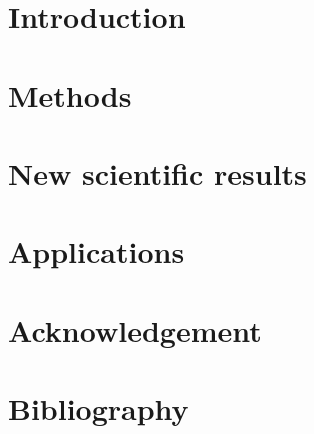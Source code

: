 \documentclass[twoside]{article}
\begin{document}


\section{Introduction}
% 
% 
\section{Methods}


\section{New scientific results}


\section{Applications}


\section{Acknowledgement}
%

\pagebreak
\section{Bibliography}

\end{document}
